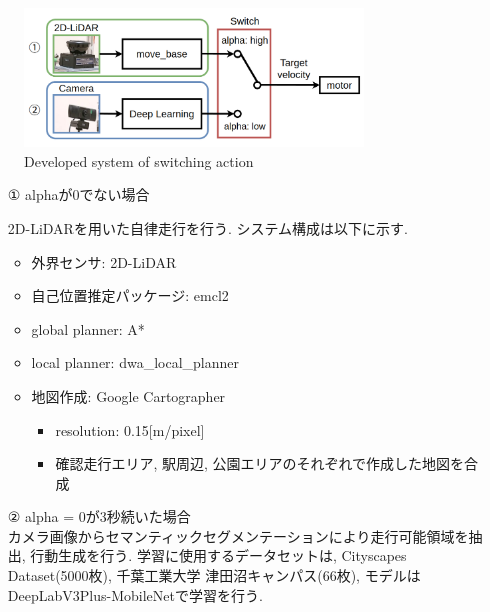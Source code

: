 \documentclass[uplatex, twocolumn, 9pt]{jsproceedings}
\begin{document}
\begin{figure}[h]
  \centering
  \includegraphics[width=90mm]{fig/switching3.pdf}
  \caption{Developed system of switching action}
  \label{fig:switching}%
\end{figure}

\begin{itemize}
  \item [①]alphaが0でない場合\par
  2D-LiDARを用いた自律走行を行う. システム構成は以下に示す. 
  \begin{itemize}
    \item 外界センサ: 2D-LiDAR
    \item 自己位置推定パッケージ: emcl2
    \item global planner: A*
    \item local planner: dwa\_local\_planner
    \item 地図作成: Google Cartographer
    \begin{itemize}
      \item resolution: 0.15[m/pixel]
      \item 確認走行エリア, 駅周辺, 公園エリアのそれぞれで作成した地図を合成
    \end{itemize}
  \end{itemize}
  \item [②]alpha = 0が3秒続いた場合\\
  カメラ画像からセマンティックセグメンテーション\cite{Deeplab}により走行可能領域を抽出, 行動生成を行う. 学習に使用するデータセットは, Cityscapes Dataset\cite{cityscapes}(5000枚), 千葉工業大学 津田沼キャンパス(66枚), モデルはDeepLabV3Plus-MobileNetで学習を行う.
\end{itemize}
\end{document}
